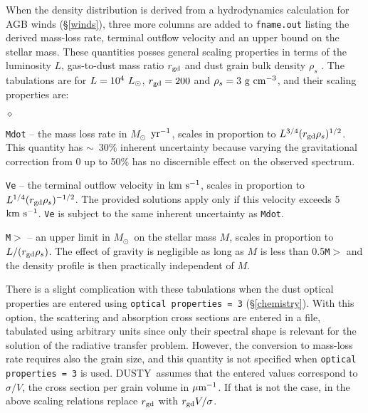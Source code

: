 \documentclass[12pt]{article} \usepackage{epsf}
\def\D  {{\sf DUSTY}}
\def\E#1{\hbox{$10^{#1}$}}
\def\about  {\hbox{$\sim$}}
\def\mic    {\hbox{$\mu$m}}
\def\Mo     {\hbox{$M_{\odot}$}}
\def\Lo     {\hbox{$L_{\odot}$}}
\def\kms    {\hbox{$\rm km\ s^{-1}$}}
\begin{document}
When the density distribution is derived from a hydrodynamics calculation for
AGB winds (\S\ref{winds}), three more columns are added to {\tt fname.out}
listing the derived mass-loss rate, terminal outflow velocity and an upper
bound on the stellar mass.  These quantities posses general scaling properties
in terms of the luminosity $L$, gas-to-dust mass ratio $r_{\rm gd}$ and dust
grain bulk density $\rho_s$ \cite{IEprep}.  The tabulations are for $L = \E4\
\Lo$, $r_{\rm gd} = 200$ and $\rho_s = 3\ \rm g~cm^{-3}$, and their scaling
properties are:
\begin{list}{$\diamond$}{}
\item
{\tt Mdot} -- the mass loss rate in \Mo\ $\rm yr^{-1}$, scales in proportion to
$L^{3/4}(r_{\rm gd}\rho_s)^{1/2}$.  This quantity has \about\ 30\% inherent
uncertainty because varying the gravitational correction from 0 up to 50\% has
no discernible effect on the observed spectrum.
\item
{\tt Ve} -- the terminal outflow velocity in \kms, scales in proportion to
$L^{1/4}(r_{\rm gd}\rho_s)^{-1/2}$. The provided solutions apply only if this
velocity exceeds 5 \kms.  {\tt Ve} is subject to the same inherent uncertainty
as {\tt Mdot}.
\item
{\tt M$>$} -- an upper limit in \Mo\ on the stellar mass $M$, scales in
proportion to $L/(r_{\rm gd}\rho_s)$.  The effect of gravity is negligible as
long as $M$ is less than 0.5{\tt *M$>$} and the density profile is then
practically independent of $M$.

\end{list}
There is a slight complication with these tabulations when the dust optical
properties are entered using {\tt optical properties = 3} (\S \ref{chemistry}).
With this option, the scattering and absorption cross sections are entered in a
file, tabulated using arbitrary units since only their spectral shape is
relevant for the solution of the radiative transfer problem. However, the
conversion to mass-loss rate requires also the grain size, and this quantity is
not specified when {\tt optical properties = 3} is used.  \D\ assumes that the
entered values correspond to $\sigma/V$, the cross section per grain volume in
$\mic^{-1}$.  If that is not the case, in the above scaling relations replace
$r_{\rm gd}$ with $r_{\rm gd}V/\sigma$.
\end{document}
